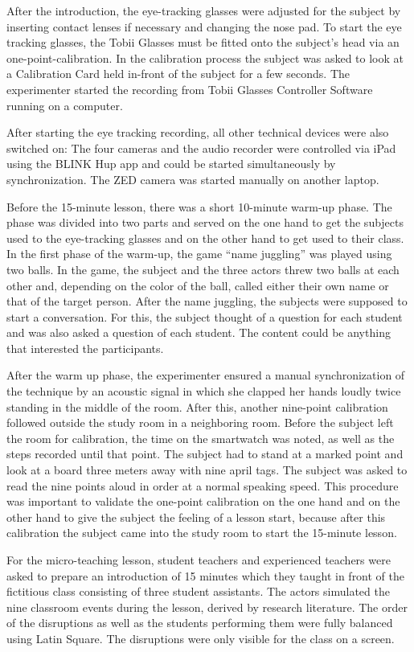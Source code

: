 \documentclass[
  man]{apa6}
\begin{document}
After the introduction, the eye-tracking glasses were adjusted for the subject by inserting contact lenses if necessary and changing the nose pad. To start the eye tracking glasses, the Tobii Glasses must be fitted onto the subject's head via an one-point-calibration. In the calibration process the subject was asked to look at a Calibration Card held in-front of the subject for a few seconds. The experimenter started the recording from Tobii Glasses Controller Software running on a computer.

After starting the eye tracking recording, all other technical devices were also switched on: The four cameras and the audio recorder were controlled via iPad using the BLINK Hup app and could be started simultaneously by synchronization. The ZED camera was started manually on another laptop.

Before the 15-minute lesson, there was a short 10-minute warm-up phase. The phase was divided into two parts and served on the one hand to get the subjects used to the eye-tracking glasses and on the other hand to get used to their class. In the first phase of the warm-up, the game ``name juggling'' was played using two balls. In the game, the subject and the three actors threw two balls at each other and, depending on the color of the ball, called either their own name or that of the target person. After the name juggling, the subjects were supposed to start a conversation. For this, the subject thought of a question for each student and was also asked a question of each student. The content could be anything that interested the participants.

After the warm up phase, the experimenter ensured a manual synchronization of the technique by an acoustic signal in which she clapped her hands loudly twice standing in the middle of the room. After this, another nine-point calibration followed outside the study room in a neighboring room. Before the subject left the room for calibration, the time on the smartwatch was noted, as well as the steps recorded until that point. The subject had to stand at a marked point and look at a board three meters away with nine april tags. The subject was asked to read the nine points aloud in order at a normal speaking speed. This procedure was important to validate the one-point calibration on the one hand and on the other hand to give the subject the feeling of a lesson start, because after this calibration the subject came into the study room to start the 15-minute lesson.

For the micro-teaching lesson, student teachers and experienced teachers were asked to prepare an introduction of 15 minutes which they taught in front of the fictitious class consisting of three student assistants. The actors simulated the nine classroom events during the lesson, derived by research literature. The order of the disruptions as well as the students performing them were fully balanced using Latin Square. The disruptions were only visible for the class on a screen.
\end{document}
